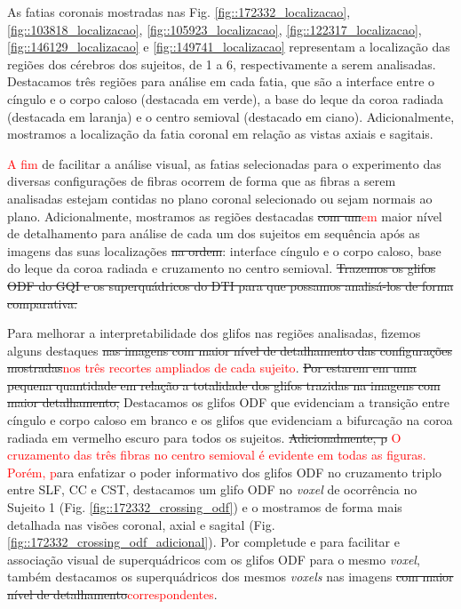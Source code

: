 As fatias coronais mostradas nas Fig.
\ref{fig::172332_localizacao},
\ref{fig::103818_localizacao},
\ref{fig::105923_localizacao},
\ref{fig::122317_localizacao},
\ref{fig::146129_localizacao} e
\ref{fig::149741_localizacao} representam a localização das regiões dos cérebros dos sujeitos, de 1 a 6, respectivamente a serem analisadas. Destacamos três regiões para análise em cada fatia, que são a interface entre o cíngulo e o corpo caloso (destacada em verde), a base do leque da coroa radiada (destacada em laranja) e o centro semioval (destacado em ciano). Adicionalmente, mostramos a localização da fatia coronal em relação as vistas axiais e sagitais.

\textcolor{red}{A fim} de facilitar a análise visual, as fatias selecionadas para o experimento das diversas configurações de fibras ocorrem de forma que as fibras a serem analisadas estejam contidas no plano coronal selecionado ou sejam normais ao plano.
Adicionalmente, mostramos as regiões destacadas \sout{com um}\textcolor{red}{em} maior nível de detalhamento para análise de cada um dos sujeitos em sequência após as imagens das suas localizações\sout{ na ordem}: interface cíngulo e o corpo caloso, base do leque da coroa radiada e cruzamento no centro semioval. \sout{Trazemos os glifos ODF do GQI e os superquádricos do DTI para que possamos analisá-los de forma comparativa.} 

Para melhorar a interpretabilidade dos glifos nas regiões analisadas, fizemos alguns destaques \sout{nas imagens com maior nível de detalhamento das configurações mostradas}\textcolor{red}{nos três recortes ampliados de cada sujeito}. \sout{Por estarem em uma pequena quantidade em relação a totalidade dos glifos trazidas na imagens com maior detalhamento,}  Destacamos os glifos ODF que evidenciam a transição entre cíngulo e corpo caloso em branco e os glifos que evidenciam a bifurcação na coroa radiada em vermelho escuro para todos os sujeitos. \sout{Adicionalmente, p} \textcolor{red}{O cruzamento das três fibras no centro semioval é evidente em todas as figuras. Porém, p}ara enfatizar o poder informativo dos glifos ODF no cruzamento triplo entre SLF, CC e CST, destacamos um glifo ODF no \textit{voxel} de ocorrência no Sujeito 1 (Fig. \ref{fig::172332_crossing_odf}) e o mostramos de forma mais detalhada nas visões coronal, axial e sagital (Fig. \ref{fig::172332_crossing_odf_adicional}). Por completude e para facilitar e associação visual de superquádricos com os glifos ODF para o mesmo \textit{voxel}, também destacamos os superquádricos dos mesmos \textit{voxels} nas imagens \sout{com maior nível de detalhamento}\textcolor{red}{correspondentes}.

